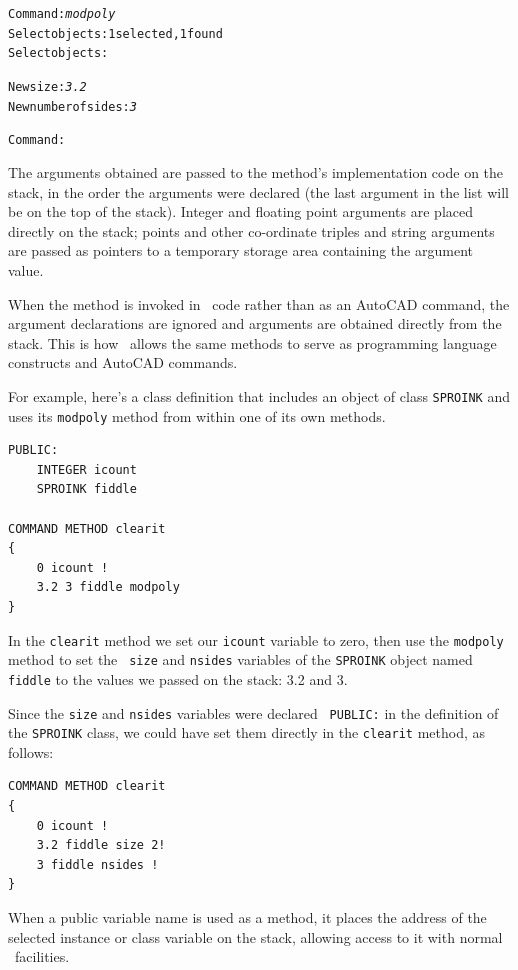 \documentclass{article}
\begin{document}
\begin{alltt}
Command: {\em modpoly}
Select objects: 1 selected, 1 found
Select objects:

New size: {\em 3.2}
New number of sides: {\em 3}

Command:
\end{alltt}

The arguments obtained are passed to the method's implementation code
on the stack, in the order the arguments were declared (the last
argument in the list will be on the top of the stack).  Integer and
floating point arguments are placed directly on the stack; points and
other co-ordinate triples and string arguments are passed as pointers
to a temporary storage area containing the argument value.

When the method is invoked in \cw\ code rather than as an AutoCAD
command, the argument declarations are ignored and arguments are
obtained directly from the stack.  This is how \cw\ allows the same
methods to serve as programming language constructs and AutoCAD
commands.

For example, here's a class definition that includes an object of class
{\tt SPROINK} and uses its {\tt modpoly} method from within one of its
own methods.

\begin{verbatim}
PUBLIC:
    INTEGER icount
    SPROINK fiddle

COMMAND METHOD clearit
{
    0 icount !
    3.2 3 fiddle modpoly
}
\end{verbatim}

In the {\tt clearit} method we set our {\tt icount} variable
to zero, then use the {\tt modpoly} method to set the {\tt
size} and {\tt nsides} variables of the {\tt SPROINK} object named
{\tt fiddle} to the values we passed on the stack: 3.2 and 3.

Since the {\tt size} and {\tt nsides} variables were declared {\tt
PUBLIC:} in the definition of the {\tt SPROINK} class, we could have
set them directly in the {\tt clearit} method, as follows:

\begin{verbatim}
COMMAND METHOD clearit
{
    0 icount !
    3.2 fiddle size 2!
    3 fiddle nsides !
}
\end{verbatim}

When a public variable name is used as a method, it places the address
of the selected instance or class variable on the stack, allowing
access to it with normal \atlas\ facilities.
\end{document}
